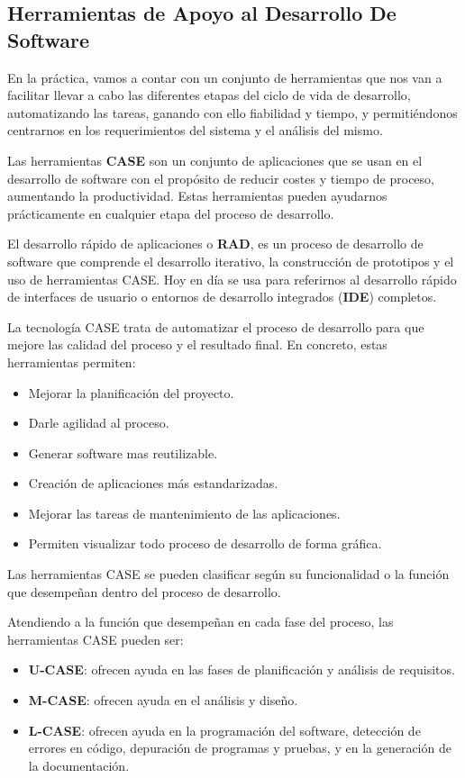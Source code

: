 \subsection{Herramientas de Apoyo al Desarrollo De Software}
En la práctica, vamos a contar con un conjunto de herramientas que nos van a facilitar llevar a cabo las diferentes etapas del ciclo de vida de desarrollo, automatizando las tareas, ganando con ello fiabilidad y tiempo, y permitiéndonos centrarnos en los requerimientos del sistema y el análisis del mismo.

Las herramientas {\bfseries \gls{CASE}} son un conjunto de aplicaciones que se usan en el desarrollo de software con el propósito de reducir costes y tiempo de proceso, aumentando la productividad. Estas herramientas pueden ayudarnos prácticamente en cualquier etapa del proceso de desarrollo.

El desarrollo rápido de aplicaciones o {\bfseries \gls{RAD}}, es un proceso de desarrollo de software que comprende el desarrollo iterativo, la construcción de prototipos y el uso de herramientas CASE. Hoy en día se usa para referirnos al desarrollo rápido de interfaces de usuario o entornos de desarrollo integrados ({\bfseries \gls{IDE}}) completos.

La tecnología CASE trata de automatizar el proceso de desarrollo para que mejore las calidad del proceso y el resultado final. En concreto, estas herramientas permiten:

\begin{itemize}
    \item Mejorar la planificación del proyecto.
    \item Darle agilidad al proceso.
    \item Generar software mas reutilizable.
    \item Creación de aplicaciones más estandarizadas.
    \item Mejorar las tareas de mantenimiento de las aplicaciones.
    \item Permiten visualizar todo proceso de desarrollo de forma gráfica.
\end{itemize}

Las herramientas CASE se pueden clasificar según su funcionalidad o la función que desempeñan dentro del proceso de desarrollo.

Atendiendo a la función que desempeñan en cada fase del proceso, las herramientas CASE pueden ser:

\begin{itemize}
    \item {\bfseries U-CASE}: ofrecen ayuda en las fases de planificación y análisis de requisitos.
    \item {\bfseries M-CASE}: ofrecen ayuda en el análisis y diseño.
    \item {\bfseries L-CASE}: ofrecen ayuda en la programación del software, detección de errores en código, depuración de programas y pruebas, y en la generación de la documentación.
\end{itemize}

